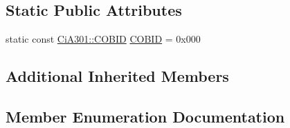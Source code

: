 \subsection*{Static Public Attributes}
\begin{DoxyCompactItemize}
\item 
static const \hyperlink{namespace_ci_a301_aec5b5dbb2b60d2837c60499f6f297aa7}{Ci\+A301\+::\+C\+O\+B\+I\+D} \hyperlink{struct_ci_a301_1_1_n_m_t_ab147f93934382f086899ab39d045603f}{C\+O\+B\+I\+D} = 0x000
\end{DoxyCompactItemize}
\subsection*{Additional Inherited Members}


\subsection{Member Enumeration Documentation}
\hypertarget{struct_ci_a301_1_1_n_m_t_a08d5e3b45a55a112518bdcc06ff3617a}{}
